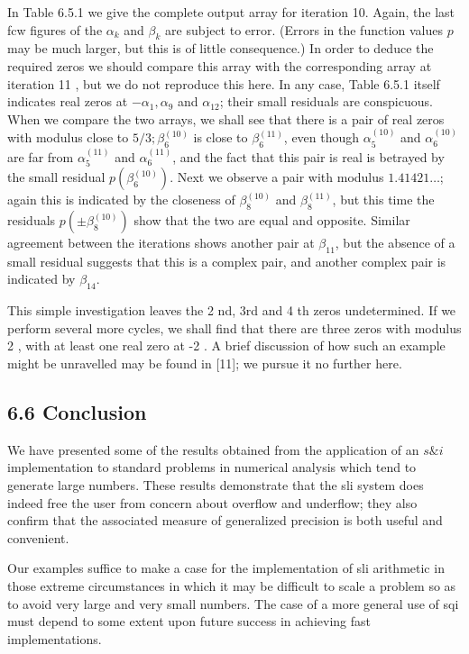 \documentclass[10pt]{article}
\begin{document}
In Table 6.5.1 we give the complete output array for iteration 10. Again, the last fcw figures of the $\alpha_{k}$ and $\beta_{k}$ are subject to error. (Errors in the function values $p$ may be much larger, but this is of little consequence.) In order to deduce the required zeros we should compare this array with the corresponding array at iteration 11 , but we do not reproduce this here. In any case, Table 6.5.1 itself indicates real zeros at $-\alpha_{1}, \alpha_{9}$ and $\alpha_{12}$; their small residuals are conspicuous. When we compare the two arrays, we shall see that there is a pair of real zeros with modulus close to $5 / 3 ; \beta_{6}^{(10)}$ is close to $\beta_{6}^{(11)}$, even though $\alpha_{5}^{(10)}$ and $\alpha_{6}^{(10)}$ are far from $\alpha_{5}^{(11)}$ and $\alpha_{6}^{(11)}$, and the fact that this pair is real is betrayed by the small residual $p\left(\beta_{6}^{(10)}\right)$. Next we observe a pair with modulus $1.41421 \ldots$; again this is indicated by the closeness of $\beta_{8}^{(10)}$ and $\beta_{8}^{(11)}$, but this time the residuals $p\left( \pm \beta_{8}^{(10)}\right)$ show that the two are equal and opposite. Similar agreement between the iterations shows another pair at $\beta_{11}$, but the absence of a small residual suggests that this is a complex pair, and another complex pair is indicated by $\beta_{14}$.

This simple investigation leaves the 2 nd, 3rd and 4 th zeros undetermined. If we perform several more cycles, we shall find that there are three zeros with modulus 2 , with at least one real zero at -2 . A brief discussion of how such an example might be unravelled may be found in [11]; we pursue it no further here.

\subsection*{6.6 Conclusion}
We have presented some of the results obtained from the application of an $s \& i$ implementation to standard problems in numerical analysis which tend to generate large numbers. These results demonstrate that the sli system does indeed free the user from concern about overflow and underflow; they also confirm that the associated measure of generalized precision is both useful and convenient.

Our examples suffice to make a case for the implementation of sli arithmetic in those extreme circumstances in which it may be difficult to scale a problem so as to avoid very large and very small numbers. The case of a more general use of sqi must depend to some extent upon future success in achieving fast implementations.
\end{document}
